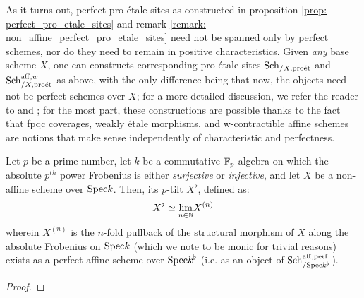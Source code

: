                     \begin{remark} \label{remark: non_perfect_pro_etale_sites}
                        As it turns out, perfect pro-\'etale sites as constructed in proposition \ref{prop: perfect_pro_etale_sites} and remark \ref{remark: non_affine_perfect_pro_etale_sites} need not be spanned only by perfect schemes, nor do they need to remain in positive characteristics. Given \textit{any} base scheme $X$, one can constructs corresponding pro-\'etale sites $\mathrm{Sch}_{/X, \mathrm{pro\acute{e}t}}$ and $\mathrm{Sch}^{\mathrm{aff}, w}_{/X, \mathrm{pro\acute{e}t}}$ as above, with the only difference being that now, the objects need not be perfect schemes over $X$; for a more detailed discussion, we refer the reader to \cite[Section 4]{bhatt_scholze_2014_pro_etale} and \cite[\href{https://stacks.math.columbia.edu/tag/0988}{Tag 0988}]{stacks}; for the most part, these constructions are possible thanks to the fact that fpqc coverages, weakly \'etale morphisms, and w-contractible affine schemes are notions that make sense independently of characteristic and perfectness. 
                    \end{remark}
                    
                    \begin{proposition} \label{prop: tilting_non_affine_schemes}
                        Let $p$ be a prime number, let $k$ be a commutative $\mathbb{F}_p$-algebra on which the absolute $p^{th}$ power Frobenius is either \textit{surjective} or \textit{injective}, and let $X$ be a non-affine scheme over $\mathrm{Spec} k$. Then, its $p$-tilt $X^{\flat}$, defined as:
                            $$X^{\flat} \simeq \underset{n \in \mathbb{N}}{\operatorname{lim}} X^{(n)}$$
                        wherein $X^{(n)}$ is the $n$-fold pullback of the structural morphism of $X$ along the absolute Frobenius on $\mathrm{Spec} k$ (which we note to be monic for trivial reasons) exists as a perfect affine scheme over $\mathrm{Spec} k^{\flat}$ (i.e. as an object of $\mathrm{Sch}^{\mathrm{aff}, \mathrm{perf}}_{/\mathrm{Spec} k^{\flat}}$).  
                    \end{proposition}
                        \begin{proof}
                            
                        \end{proof}
                    \begin{corollary}
                        
                    \end{corollary}
                    
